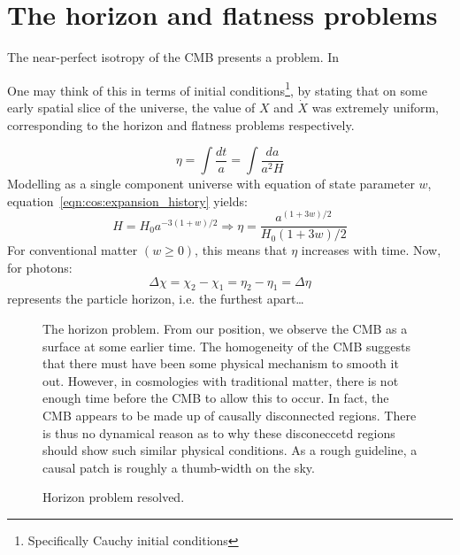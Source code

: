 \section{The horizon and flatness problems}
The near-perfect isotropy of the CMB presents a problem. In 

One may think of this in terms of initial conditions\footnote{Specifically Cauchy initial conditions}, by stating that on some early spatial slice of the universe, the value of $X$ and $\dot{X}$ was extremely uniform, corresponding to the horizon and flatness problems respectively. 

\begin{equation}
  \eta = \int \frac{dt}{a} = \int \frac{da}{a^2H}
\end{equation}
Modelling as a single component universe with equation of state parameter $w$, equation~\eqref{eqn:cos:expansion_history} yields:
\begin{equation}
  H = H_0a^{-3(1+w)/2} \Rightarrow \eta =\frac{a^{(1+3w)/2}}{H_0(1+3w)/2}%
\end{equation}
For conventional matter $(w\ge0)$, this means that $\eta$ increases with time. Now, for photons:
\begin{equation}
  \Delta\chi = \chi_2 - \chi_1 = \eta_2 - \eta_1 = \Delta\eta
\end{equation}
represents the particle horizon, i.e. the furthest apart\ldots 

\begin{figure}
  \centering
  
  \caption{The horizon problem. From our position, we observe the CMB as a surface at some earlier time. The homogeneity of the CMB suggests that there must have been some physical mechanism to smooth it out. However, in cosmologies with traditional matter, there is not enough time before the CMB to allow this to occur. In fact, the CMB appears to be made up of causally disconnected regions. There is thus no dynamical reason as to why these disconeccetd regions should show such similar physical conditions. As a rough guideline, a causal patch is roughly a thumb-width on the sky.}\label{fig:cos:horizon_problem}
\end{figure}

\begin{figure}
  \centering
  
  \caption{Horizon problem resolved.\label{fig:cos:horizon_problem_resolved}}
\end{figure}

